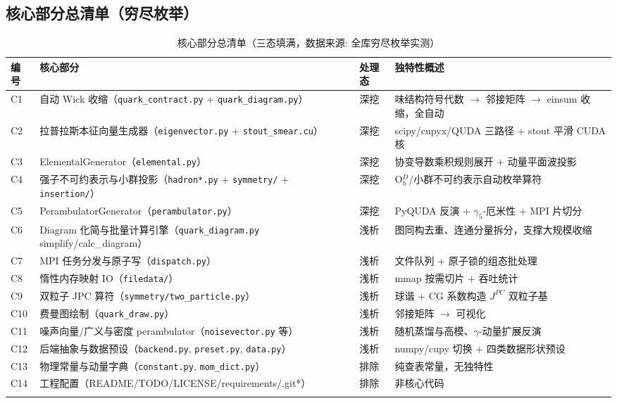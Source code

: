 \documentclass[UTF8]{ctexart}
\begin{document}
\subsection{核心部分总清单（穷尽枚举）}
{\footnotesize\begin{xltabular}{\textwidth}{lXlX}
\toprule
\textcolor{algo}{编号} & 核心部分 & 处理态 & 独特性概述 \\
\midrule
\endhead
C1 & 自动 Wick 收缩（\texttt{\nolinkurl{quark_contract.py}} + \texttt{\nolinkurl{quark_diagram.py}}） & 深挖 & 味结构符号代数 $\to$ 邻接矩阵 $\to$ einsum 收缩，全自动 \\
C2 & 拉普拉斯本征向量生成器（\texttt{\nolinkurl{eigenvector.py}} + \texttt{\nolinkurl{stout_smear.cu}}） & 深挖 & scipy/cupyx/QUDA 三路径 + stout 平滑 CUDA 核 \\
C3 & ElementalGenerator（\texttt{\nolinkurl{elemental.py}}） & 深挖 & 协变导数乘积规则展开 + 动量平面波投影 \\
C4 & 强子不可约表示与小群投影（\texttt{hadron*.py} + \texttt{\nolinkurl{symmetry/}} + \texttt{\nolinkurl{insertion/}}） & 深挖 & O$_h^D$/小群不可约表示自动枚举算符 \\
C5 & PerambulatorGenerator（\texttt{\nolinkurl{perambulator.py}}） & 深挖 & PyQUDA 反演 + $\gamma_5$-厄米性 + MPI 片切分 \\
C6 & Diagram 化简与批量计算引擎（\texttt{\nolinkurl{quark_diagram.py}} simplify/calc\_diagram） & 浅析 & 图同构去重、连通分量拆分，支撑大规模收缩 \\
C7 & MPI 任务分发与原子写（\texttt{\nolinkurl{dispatch.py}}） & 浅析 & 文件队列 + 原子锁的组态批处理 \\
C8 & 惰性内存映射 IO（\texttt{\nolinkurl{filedata/}}） & 浅析 & mmap 按需切片 + 吞吐统计 \\
C9 & 双粒子 JPC 算符（\texttt{\nolinkurl{symmetry/two_particle.py}}） & 浅析 & 球谐 + CG 系数构造 $J^{PC}$ 双粒子基 \\
C10 & 费曼图绘制（\texttt{\nolinkurl{quark_draw.py}}） & 浅析 & 邻接矩阵 $\to$ 可视化 \\
C11 & 噪声向量/广义与密度 perambulator（\texttt{\nolinkurl{noisevector.py}} 等） & 浅析 & 随机蒸馏与高模、$\gamma$-动量扩展反演 \\
C12 & 后端抽象与数据预设（\texttt{\nolinkurl{backend.py}}, \texttt{\nolinkurl{preset.py}}, \texttt{\nolinkurl{data.py}}） & 浅析 & numpy/cupy 切换 + 四类数据形状预设 \\
C13 & 物理常量与动量字典（\texttt{\nolinkurl{constant.py}}, \texttt{\nolinkurl{mom_dict.py}}） & 排除 & 纯查表常量，无独特性 \\
C14 & 工程配置（README/TODO/LICENSE/requirements/.git*） & 排除 & 非核心代码 \\
\bottomrule
\caption{核心部分总清单（三态填满，数据来源: 全库穷尽枚举实测）}
\end{xltabular}}
\end{document}
